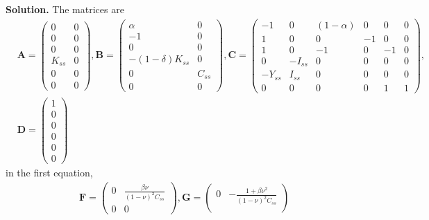 \documentclass[11pt]{article}
\numberwithin{equation}{section} %
\numberwithin{figure}{section} %
\numberwithin{table}{section} %
\theoremstyle{definition}
\newenvironment{solution}{\begin{addmargin}[2em]{0em} {\bf Solution. }}{\end{addmargin}}
\begin{document}
\begin{solution}
    The matrices are
    \begin{align*}
        &\mathbf{A} = \begin{pmatrix}
            0 & 0 \\
            0 & 0 \\
            0 & 0 \\
            K_{ss} & 0 \\
            0 & 0 \\
            0 & 0
        \end{pmatrix}, \mathbf{B} = \begin{pmatrix}
            \alpha & 0 \\
            -1 & 0 \\
            0 & 0 \\
            -(1-\delta) K_{ss} & 0 \\
            0 & C_{ss} \\
            0 & 0
        \end{pmatrix}, \mathbf{C} = \begin{pmatrix}
            -1 & 0 & (1-\alpha) & 0 & 0 & 0 \\
            1 & 0 & 0 & -1 & 0 & 0 \\
            1 & 0 & -1 & 0 & -1 & 0 \\
            0 & -I_{ss} & 0 & 0 & 0 & 0 \\
            -Y_{ss} & I_{ss} & 0 & 0 & 0 & 0 \\
            0 & 0 & 0 & 0 & 1 & 1
        \end{pmatrix}, \\
        &\mathbf{D} = \begin{pmatrix}
            1 \\ 0 \\ 0 \\ 0 \\ 0 \\ 0
       \end{pmatrix}
    \end{align*}
    in the first equation,
    \begin{align*}
        &\mathbf{F} = \begin{pmatrix}
            0 & \frac{\beta \nu}{(1 - \nu)^2 C_{ss}} \\
            0 & 0
        \end{pmatrix}, \mathbf{G} = \begin{pmatrix}
            0 & -\frac{1 + \beta \nu^2}{(1 - \nu)^2 C_{ss}} \\

\end{pmatrix}
\end{align*}
\end{solution}
\end{document}
